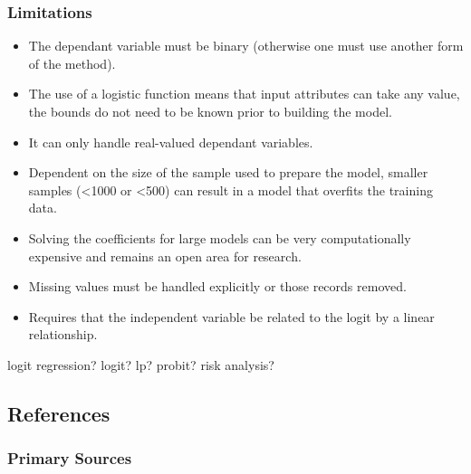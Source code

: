 \subsubsection{Limitations}

\begin{itemize}
	\item The dependant variable must be binary (otherwise one must use another form of the method).
	\item The use of a logistic function means that input attributes can take any value, the bounds do not need to be known prior to building the model.
	\item It can only handle real-valued dependant variables.
	\item Dependent on the size of the sample used to prepare the model, smaller samples (<1000 or <500) can result in a model that overfits the training data.
	\item Solving the coefficients for large models can be very computationally expensive and remains an open area for research.
	\item Missing values must be handled explicitly or those records removed.
	\item Requires that the independent variable be related to the logit by a linear relationship.
\end{itemize}

logit regression?
logit? lp? probit?
risk analysis?

\subsection{References}

\subsubsection{Primary Sources}



